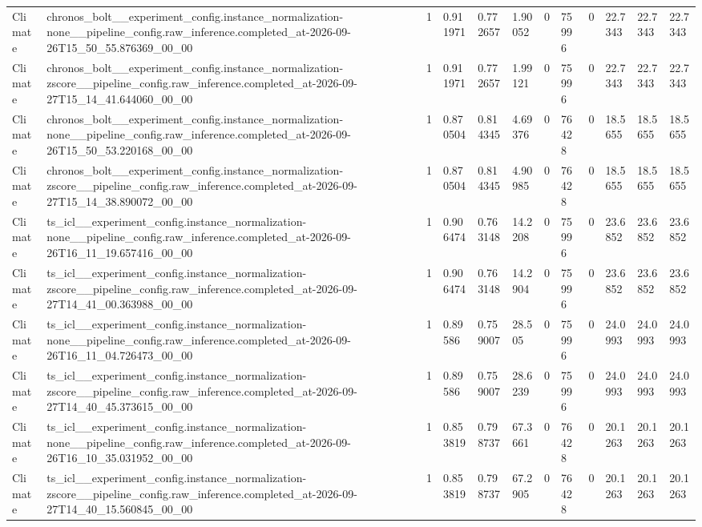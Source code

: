 \begin{tabular}{llllllllllll}
Climate & chronos\_bolt\_\_experiment\_config.instance\_normalization-none\_\_pipeline\_config.raw\_inference.completed\_at-2026-09-26T15\_50\_55.876369\_00\_00 & 1 & 0.911971 & 0.772657 & 1.90052 & 0 & 75996 & 0 & 22.7343 & 22.7343 & 22.7343 \\
Climate & chronos\_bolt\_\_experiment\_config.instance\_normalization-zscore\_\_pipeline\_config.raw\_inference.completed\_at-2026-09-27T15\_14\_41.644060\_00\_00 & 1 & 0.911971 & 0.772657 & 1.99121 & 0 & 75996 & 0 & 22.7343 & 22.7343 & 22.7343 \\
Climate & chronos\_bolt\_\_experiment\_config.instance\_normalization-none\_\_pipeline\_config.raw\_inference.completed\_at-2026-09-26T15\_50\_53.220168\_00\_00 & 1 & 0.870504 & 0.814345 & 4.69376 & 0 & 76428 & 0 & 18.5655 & 18.5655 & 18.5655 \\
Climate & chronos\_bolt\_\_experiment\_config.instance\_normalization-zscore\_\_pipeline\_config.raw\_inference.completed\_at-2026-09-27T15\_14\_38.890072\_00\_00 & 1 & 0.870504 & 0.814345 & 4.90985 & 0 & 76428 & 0 & 18.5655 & 18.5655 & 18.5655 \\
Climate & ts\_icl\_\_experiment\_config.instance\_normalization-none\_\_pipeline\_config.raw\_inference.completed\_at-2026-09-26T16\_11\_19.657416\_00\_00 & 1 & 0.906474 & 0.763148 & 14.2208 & 0 & 75996 & 0 & 23.6852 & 23.6852 & 23.6852 \\
Climate & ts\_icl\_\_experiment\_config.instance\_normalization-zscore\_\_pipeline\_config.raw\_inference.completed\_at-2026-09-27T14\_41\_00.363988\_00\_00 & 1 & 0.906474 & 0.763148 & 14.2904 & 0 & 75996 & 0 & 23.6852 & 23.6852 & 23.6852 \\
Climate & ts\_icl\_\_experiment\_config.instance\_normalization-none\_\_pipeline\_config.raw\_inference.completed\_at-2026-09-26T16\_11\_04.726473\_00\_00 & 1 & 0.89586 & 0.759007 & 28.505 & 0 & 75996 & 0 & 24.0993 & 24.0993 & 24.0993 \\
Climate & ts\_icl\_\_experiment\_config.instance\_normalization-zscore\_\_pipeline\_config.raw\_inference.completed\_at-2026-09-27T14\_40\_45.373615\_00\_00 & 1 & 0.89586 & 0.759007 & 28.6239 & 0 & 75996 & 0 & 24.0993 & 24.0993 & 24.0993 \\
Climate & ts\_icl\_\_experiment\_config.instance\_normalization-none\_\_pipeline\_config.raw\_inference.completed\_at-2026-09-26T16\_10\_35.031952\_00\_00 & 1 & 0.853819 & 0.798737 & 67.3661 & 0 & 76428 & 0 & 20.1263 & 20.1263 & 20.1263 \\
Climate & ts\_icl\_\_experiment\_config.instance\_normalization-zscore\_\_pipeline\_config.raw\_inference.completed\_at-2026-09-27T14\_40\_15.560845\_00\_00 & 1 & 0.853819 & 0.798737 & 67.2905 & 0 & 76428 & 0 & 20.1263 & 20.1263 & 20.1263 \\

\end{tabular}
